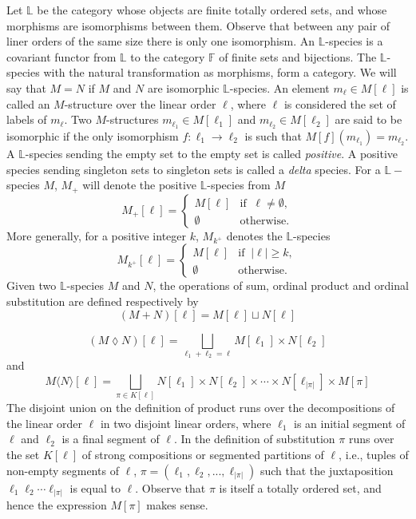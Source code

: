 \documentclass[11pt]{article}
\theoremstyle{definition}
\begin{document}
Let $\mathbb{L}$ be the category whose objects are finite totally ordered sets, and whose morphisms are isomorphisms between them. Observe that between
any pair of liner orders of the same size there is only one isomorphism. An $\mathbb{L}$-species is a covariant
functor from $\mathbb{L}$ to the category $\mathbb{F}$ of finite sets and bijections. The $\mathbb{L}$-species with the natural
transformation as morphisms, form a category. We will say that $M = N$ if $M$ and $N$ are isomorphic $\mathbb{L}$-species. An element $m_{\ell}\in M[\ell]$ is called an $M$-structure over the linear order $\ell$, where $\ell$ is considered the set of labels of $m_{\ell}$. Two $M$-structures $m_{{\ell}_1}\in M[{\ell}_1]$ and $m_{{\ell}_2}\in M[{\ell}_2]$ are said to be isomorphic if the only isomorphism $f:{\ell}_1 \longrightarrow {\ell}_2$ is such that $M[f](m_{{\ell}_1})=m_{{\ell}_2}$.
A $\mathbb{L}$-species sending the empty set to the empty set is called \emph{positive}. A positive species sending singleton sets to singleton sets is called a \emph{delta} species. For a $\mathbb{L}-$species $M$, $M_+$ will denote the positive $\mathbb{L}$-species from $M$
\[M_+[\ell]=\left\{\begin{array}{cc}
    M[\ell] & \mbox{if}\;\;\ell\neq \emptyset,  \\
    \emptyset & \mbox{otherwise.}
\end{array}\right.
\]
More generally, for a positive integer $k$, $M_{k^+}$ denotes the $\mathbb{L}$-species
\[M_{k^+}[\ell]=\left\{\begin{array}{cc}
    M[\ell] & \mbox{if}\;\;|\ell|\geq k,  \\
    \emptyset & \mbox{otherwise.}
\end{array}\right.
\]
Given two $\mathbb{L}$-species $M$ and $N$, the operations of sum, ordinal product and ordinal substitution are defined respectively by
\begin{equation}
(M+N)[\ell]=M[\ell]\sqcup N[\ell]
\end{equation}

\begin{equation}\label{product species}
(M\lozenge N)[\ell]=\bigsqcup_{\ell_1+\ell_2=\ell} M[\ell_1]\times N[\ell_2]
\end{equation}
and
\begin{equation}\label{specie subtitution}
 M\langle N \rangle[\ell]=\bigsqcup_{\pi \in K[\ell]} N[\ell_1]\times N[\ell_2]\times \cdots \times N[\ell_{|\pi|}]\times M[\pi]
\end{equation}
The disjoint union on the definition of product runs over the decompositions of the linear order $\ell$
in two disjoint linear orders, where $\ell_1$ is an initial segment of $\ell$ and $\ell_2$ is a final segment of $\ell$. In
the definition of substitution $\pi$ runs over the set $K[\ell]$ of strong compositions or segmented partitions of $\ell$, i.e., tuples of
non-empty segments of $\ell$, $\pi=(\ell_1, \ell_2, . . . , \ell_{|\pi|})$ such that the juxtaposition $\ell_1\ell_2\cdots \ell_{|\pi|}$ is equal to $\ell$. Observe that $\pi$ is itself a totally ordered set, and hence the expression $M[\pi]$ makes sense.
\end{document}
